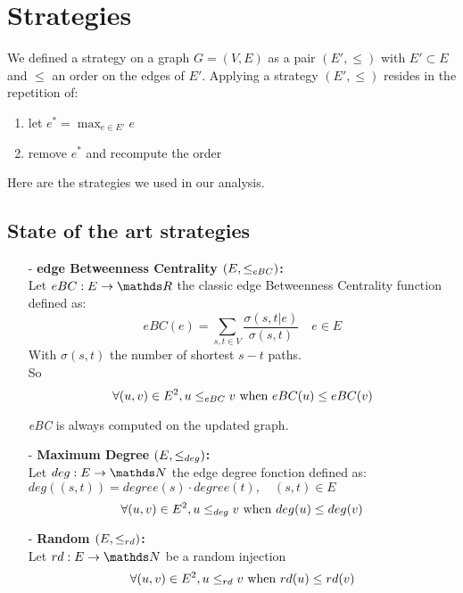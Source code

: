 \section{Strategies}
\label{sec:strategies}
    We defined a strategy on a graph $G = (V, E)$ as a pair $(E', \leq)$ with $E'\subset E$ and $\leq$ an order on the edges of $E'$. Applying a strategy $(E', \leq)$ resides in the repetition of:
    \begin{enumerate}
        \item let $e^* = \max_{e\in E'}{e}$
        \item remove $e^*$ and recompute the order
    \end{enumerate}Here are the strategies we used in our analysis.
    \subsection*{State of the art strategies}
    \begin{itemize}
        \item[-] \textbf{edge Betweenness Centrality $(E, \leq_{eBC})$:}\\
        Let $eBC: E \to \R$ the classic edge Betweenness Centrality function defined as:
        $$eBC(e) = \sum_{s, t \in V}\frac{\sigma(s, t | e)}{\sigma(s, t)} \quad e\in E$$
        With $\sigma(s, t)$ the number of shortest $s-t$ paths.\\
        So $$\forall (u, v) \in E^2, u \leq_{eBC} v \text{ when } eBC(u) \leq eBC(v)$$

        \textit{eBC} is always computed on the updated graph.
        \item[-] \textbf{Maximum Degree $(E, \leq_{deg})$:}\\
        Let $deg: E \to \N$ the edge degree fonction defined as: $deg((s, t)) = degree(s) \cdot degree(t),\quad (s, t)\in E$
        $$\forall (u, v) \in E^2, u \leq_{deg} v \text{ when } deg(u) \leq deg(v)$$
        \item[-] \textbf{Random $(E, \leq_{rd})$:}\\
        Let $rd: E \to \N$ be a random injection
        $$\forall (u, v) \in E^2, u \leq_{rd} v \text{ when } rd(u) \leq rd(v)$$
    \end{itemize}

